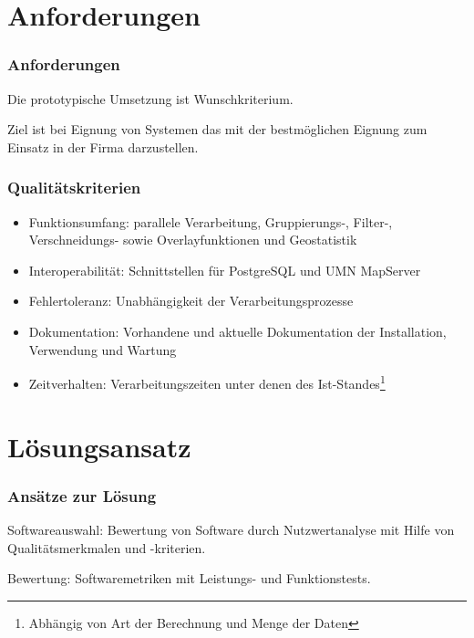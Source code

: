 \documentclass{beamer}
\begin{document}
\section{Anforderungen}
\begin{frame}\frametitle{Anforderungen}
Die prototypische Umsetzung ist Wunschkriterium.\\ %

\vspace{\baselineskip}


Ziel ist bei Eignung von Systemen das mit der bestmöglichen Eignung zum Einsatz in der Firma darzustellen.
\end{frame}

\begin{frame}\frametitle{Qualitätskriterien}
\begin{itemize}
\item Funktionsumfang: parallele Verarbeitung, Gruppierungs-, Filter-, Verschneidungs- sowie Overlayfunktionen und Geostatistik
\item Interoperabilität: Schnittstellen für PostgreSQL und UMN MapServer
\item Fehlertoleranz: Unabhängigkeit der Verarbeitungsprozesse
\item Dokumentation: Vorhandene und aktuelle Dokumentation der Installation, Verwendung und Wartung
\item Zeitverhalten: Verarbeitungszeiten unter denen des Ist-Standes\footnote{Abhängig von Art der Berechnung und Menge der Daten}
\end{itemize}
\end{frame}

\section{Lösungsansatz}


\begin{frame}\frametitle{Ansätze zur Lösung}
\begin{block}{Softwareauswahl:}
Bewertung von Software durch Nutzwertanalyse mit Hilfe von Qualitätsmerkmalen und -kriterien.\\
\end{block}
\vspace{\baselineskip}
\begin{block}{Bewertung:}
Softwaremetriken mit Leistungs- und Funktionstests.
\end{block}
\end{frame}
% 
\end{document}
